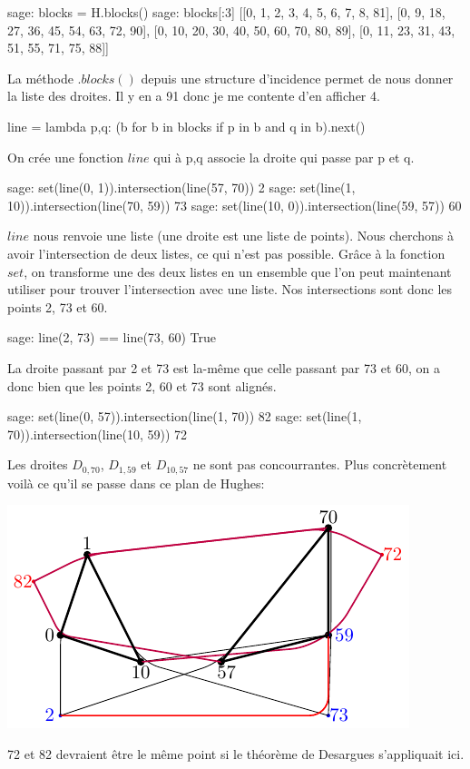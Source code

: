\documentclass[a4paper]{article}
\begin{document}
\begin{sageverbatim}
 sage: blocks = H.blocks()
 sage: blocks[:3]
 [[0, 1, 2, 3, 4, 5, 6, 7, 8, 81],
 [0, 9, 18, 27, 36, 45, 54, 63, 72, 90],
 [0, 10, 20, 30, 40, 50, 60, 70, 80, 89],
 [0, 11, 23, 31, 43, 51, 55, 71, 75, 88]]
\end{sageverbatim}
La méthode $.blocks()$ depuis une structure d'incidence permet de nous donner la liste des droites. Il y en a 91 donc je me contente d'en afficher 4.
\begin{sageverbatim}
 line = lambda p,q: (b for b in blocks if p in b and q in b).next()
\end{sageverbatim}
On crée une fonction $line$ qui à p,q associe la droite qui passe par p et q.
\begin{sageverbatim}
 sage: set(line(0, 1)).intersection(line(57, 70))
 {2}
 sage: set(line(1, 10)).intersection(line(70, 59))
 {73}
 sage: set(line(10, 0)).intersection(line(59, 57))
 {60}
\end{sageverbatim}
$line$ nous renvoie une liste (une droite est une liste de points). Nous cherchons à avoir l'intersection de deux listes, ce qui n'est pas possible. Grâce à la fonction $set$, on transforme une des deux listes en un ensemble que l'on peut maintenant utiliser pour trouver l'intersection avec une liste. Nos intersections sont donc les points 2, 73 et 60.
\begin{sageverbatim}
 sage: line(2, 73) == line(73, 60)
 True
\end{sageverbatim}
La droite passant par 2 et 73 est la-même que celle passant par 73 et 60, on a donc bien que les points 2, 60 et 73 sont alignés.
\begin{sageverbatim}
 sage: set(line(0, 57)).intersection(line(1, 70))
 {82}
 sage: set(line(1, 70)).intersection(line(10, 59))
 {72}
\end{sageverbatim}
Les droites $D_{0,70}$, $D_{1,59}$ et $D_{10,57}$ ne sont pas concourrantes.
Plus concrètement voilà ce qu'il se passe dans ce plan de Hughes:
\begin{center}
  \includegraphics[scale=1.5]{Hughestikz.pdf}
\end{center}
72 et 82 devraient être le même point si le théorème de Desargues s'appliquait ici.
\end{document}
